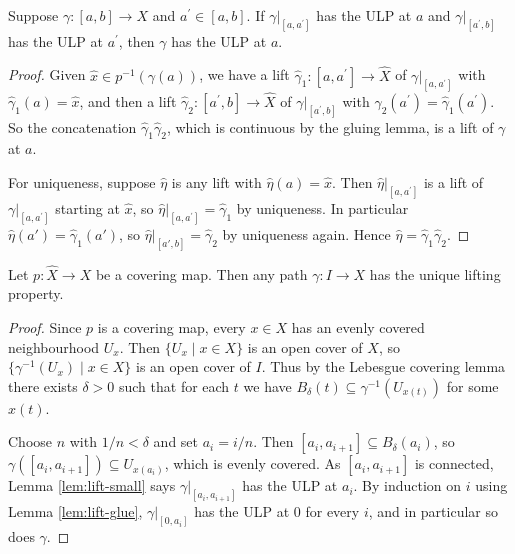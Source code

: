 \documentclass[a4paper]{scrartcl}
\begin{document}
\begin{lemma} \label{lem:lift-glue}
	Suppose $\gamma:[a, b] \rightarrow X$ and $a^{\prime} \in[a, b]$. If $\gamma|_{[a, a^{\prime}]}$ has the ULP at $a$ and $\gamma|_{[a^{\prime}, b]}$ has the ULP at $a^{\prime}$, then $\gamma$ has the ULP at $a$.
\end{lemma}
\begin{proof}
	Given $\hat x \in p^{-1}(\gamma(a))$, we have a lift $\hat{\gamma}_1:[a, a^{\prime}] \rightarrow \hat{X}$ of $\gamma|_{[a, a^{\prime}]}$ with $\hat\gamma_1(a) = \hat x$, and then a lift $\hat{\gamma}_2:[a^{\prime}, b] \rightarrow \hat{X}$ of $\gamma|_{[a^{\prime}, b]}$ with $\hat{\gamma}_2(a^{\prime})=\hat{\gamma}_1(a^{\prime})$. So the concatenation $\hat{\gamma}_1 \hat{\gamma}_2$, which is continuous by the gluing lemma, is a lift of $\gamma$ at $a$.

	For uniqueness, suppose $\hat{\eta}$ is any lift with $\hat\eta(a) = \hat x$. Then $\hat{\eta}|_{[a, a^{\prime}]}$ is a lift of $\gamma|_{[a, a^{\prime}]}$ starting at $\hat x$, so $\hat{\eta}|_{[a, a^{\prime}]}=\hat{\gamma}_1$ by uniqueness. In particular $\hat\eta(a') = \hat\gamma_1(a')$, so $\hat\eta|_{[a',b]} = \hat\gamma_2$ by uniqueness again. Hence $\hat\eta = \hat\gamma_1\hat\gamma_2$.
\end{proof}

\begin{theorem} \label{thm:path-lifting}
	Let $p: \hat X \to X$ be a covering map. Then any path $\gamma: I \rightarrow X$ has the unique lifting property.
\end{theorem}
\begin{proof}
	Since $p$ is a covering map, every $x \in X$ has an evenly covered neighbourhood $U_x$. Then $\{U_x \mid x \in X\}$ is an open cover of $X$, so $\{\gamma^{-1}(U_x) \mid x \in X\}$ is an open cover of $I$. Thus by the Lebesgue covering lemma there exists $\delta>0$ such that for each $t$ we have $B_\delta(t) \subseteq \gamma^{-1}(U_{x(t)})$ for some $x(t)$.

	Choose $n$ with $1/n<\delta$ and set $a_i=i/n$. Then $[a_i, a_{i+1}] \subseteq B_\delta(a_i)$, so $\gamma([a_i, a_{i+1}]) \subseteq U_{x(a_i)}$, which is evenly covered. As $[a_i,a_{i+1}]$ is connected, Lemma \ref{lem:lift-small} says $\gamma|_{[a_i, a_{i+1}]}$ has the ULP at $a_i$. By induction on $i$ using Lemma \ref{lem:lift-glue}, $\gamma|_{[0,a_i]}$ has the ULP at $0$ for every $i$, and in particular so does $\gamma$.
\end{proof}
\end{document}
